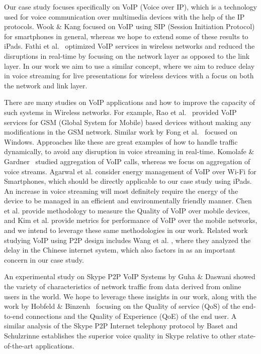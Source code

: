 Our case study focuses specifically on VoIP (Voice over IP), which is a 
technology used for voice communication over multimedia devices with the help of 
the IP protocols. Wook \& Kang \cite{HS_VoIP_ICTC10} focused on VoIP using SIP 
(Session 
Initiation 
Protocol) for smartphones in general, whereas we hope to extend some of these 
results to iPads.  Fathi et al.~\cite{HSR_VoIP_TVT07} optimized VoIP services 
in wireless networks 
and reduced the disruptions in real-time by focusing on the network layer as 
opposed to the link layer.   In our work we aim to use a similar concept, where 
we aim to reduce delay in voice streaming for live presentations for wireless 
devices with a focus on both the network and link layer.  
 
There are many studies on VoIP applications and how to improve the capacity of 
such systems in Wireless networks.  For example, Rao et 
al.~\cite{HYS_VoIP_COM00} provided VoIP 
services for GSM (Global System for Mobile) based devices without making any 
modifications in the GSM network.  Similar work by Fong et 
al.~\cite{MRSR_VoIP_COM08} focused on 
Windows.  Approaches like these are great examples of how to handle traffic 
dynamically, to avoid any disruption in voice streaming in real-time. Komolafe 
\& Gardner~\cite{OR_VoIP_PMC03} studied aggregation of VoIP calls, whereas we 
focus on 
aggregation 
of voice streams. Agarwal et al. \cite{YRAP_VoIP_MSYS07} consider energy 
management of VoIP over 
Wi-Fi for Smartphones, which should be directly applicable to our case study 
using iPads.  An increase in voice streaming will most definitely require the 
energy of the device to be managed in an efficient and environmentally friendly 
manner.   Chen et al. \cite{WPY_VoIP_SYS11} provide methodology to measure the 
Quality of VoIP 
over mobile devices, and Kim et al. \cite{DHMS_WiMAX_WOW08} provide metrics for 
performance of VoIP 
over the mobile networks, and we intend to leverage these same methodologies in 
our work.  Related work studying VoIP using P2P design includes Wang et al. 
\cite{GCXZ_P2PVoIP_MTA13}, where they analyzed the delay in the Chinese internet 
system, which also 
factors in as an important concern in our case study.
 
An experimental study on Skype P2P VoIP Systems by Guha \& Daswani 
\cite{SN_Skype_CIST05} showed 
the variety of characteristics of network traffic from data derived from online 
users in the world.  We hope to leverage these insights in our work, along with 
the
work by  Hobfeld \& Binzenh~\cite{TA_Skype_COMPNET08} focusing on the Quality 
of service (QoS) of the end-to-end connections and the Quality of Experience 
(QoE) of the end user. A 
similar analysis of the Skype P2P Internet telephony protocol by Baset and 
Schulzrinne \cite{SH_Skype_INFO06} establishes the superior voice quality in 
Skype relative to 
other state-of-the-art applications.
 
